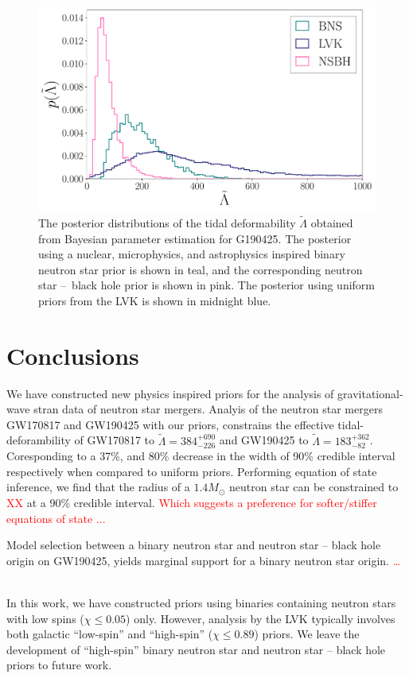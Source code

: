 \documentclass[twocolumn]{aastex631}
\newcommand{\red}[1]{\textcolor{red}{#1}}
\begin{document}
	
\begin{figure}[H]
		\centering
		\includegraphics[width=1.\linewidth]{Fig_3_GW190425_lambda_tilde_posteriors.pdf}
		\caption{The posterior distributions of the tidal deformability $\tilde{\Lambda}$ obtained from Bayesian parameter estimation for G190425. The posterior using a nuclear, microphysics, and astrophysics inspired binary neutron star prior is shown in teal, and the corresponding neutron star --~black hole prior is shown in pink. 
			The posterior using uniform priors from the LVK is shown in midnight blue. }
		\label{fig:GW190425_tides}
\end{figure}
\section{Conclusions}
We have constructed new physics inspired priors for the analysis of gravitational-wave stran data of neutron star mergers. 
Analyis of the neutron star mergers GW170817 and GW190425 with our priors, constrains the effective tidal-deforambility of GW170817 to $\tilde{\Lambda} = 384^{+690}_{-226}$ and GW190425 to $\tilde{\Lambda} = 183^{+362}_{-82}$. Coresponding  
to a 37\%, and 80\% decrease in the width of 90\% credible interval respectively when compared to uniform priors. 
Performing equation of state inference, we find that the radius of a $1.4 M_\odot$ neutron star can be constrained to \red{XX} at a 90\% credible interval. \red{Which suggests a preference for softer/stiffer equations of state ...}
	\

Model selection between a binary neutron star and neutron star -- black hole origin on GW190425, yields marginal support for a binary neutron star origin. \red{\ldots}
	\

In this work, we have constructed priors using binaries containing neutron stars with low spins ($\chi \leq 0.05$) only. However, analysis by the LVK typically involves both galactic ``low-spin'' and ``high-spin'' ($\chi \leq 0.89$) priors. We leave the development of ``high-spin'' binary neutron star and neutron star -- black hole priors to future work. 
\appendix
	
\end{document}
